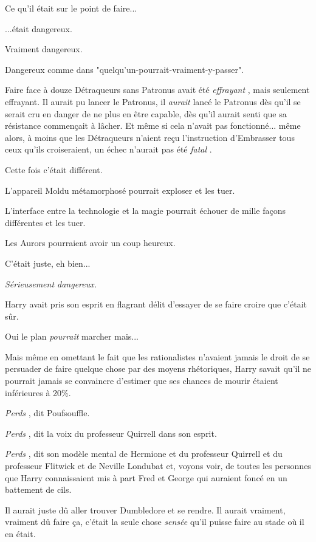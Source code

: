 Ce qu'il était sur le point de faire...

...était dangereux.

Vraiment dangereux.

Dangereux comme dans "quelqu'un-pourrait-vraiment-y-passer".

Faire face à douze Détraqueurs sans Patronus avait été \emph{effrayant} , mais seulement effrayant. Il aurait pu lancer le Patronus, il \emph{aurait}  lancé le Patronus dès qu'il se serait cru en danger de ne plus en être capable, dès qu'il aurait senti que sa résistance commençait à lâcher. Et même si cela n'avait pas fonctionné... même alors, à moins que les Détraqueurs n'aient reçu l'instruction d'Embrasser tous ceux qu'ils croiseraient, un échec n'aurait pas été \emph{fatal} .

Cette fois c'était différent.

L'appareil Moldu métamorphosé pourrait exploser et les tuer.

L'interface entre la technologie et la magie pourrait échouer de mille façons différentes et les tuer.

Les Aurors pourraient avoir un coup heureux.

C'était juste, eh bien...

\emph{Sérieusement dangereux.} 

Harry avait pris son esprit en flagrant délit d'essayer de se faire croire que c'était sûr.

Oui le plan \emph{pourrait}  marcher mais...

Mais même en omettant le fait que les rationalistes n'avaient jamais le droit de se persuader de faire quelque chose par des moyens rhétoriques, Harry savait qu'il ne pourrait jamais se convaincre d'estimer que ses chances de mourir étaient inférieures à 20\%.

\emph{Perds} , dit Poufsouffle.

\emph{Perds} , dit la voix du professeur Quirrell dans son esprit.

\emph{Perds} , dit son modèle mental de Hermione et du professeur Quirrell et du professeur Flitwick et de Neville Londubat et, voyons voir, de toutes les personnes que Harry connaissaient mis à part Fred et George qui auraient foncé en un battement de cils.

Il aurait juste dû aller trouver Dumbledore et se rendre. Il aurait vraiment, vraiment dû faire ça, c'était la seule chose \emph{sensée}  qu'il puisse faire au stade où il en était.

